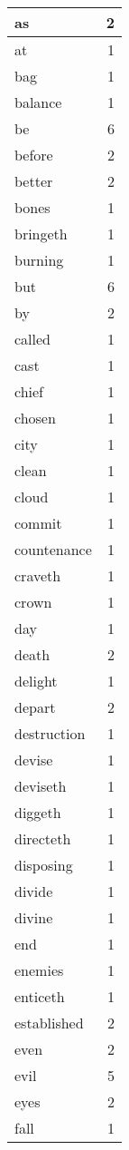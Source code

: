 \begin{center}
\begin{longtable}{l|r}
as & 2\\ \hline 
at & 1\\ \hline 
bag & 1\\ \hline 
balance & 1\\ \hline 
be & 6\\ \hline 
before & 2\\ \hline 
better & 2\\ \hline 
bones & 1\\ \hline 
bringeth & 1\\ \hline 
burning & 1\\ \hline 
but & 6\\ \hline 
by & 2\\ \hline 
called & 1\\ \hline 
cast & 1\\ \hline 
chief & 1\\ \hline 
chosen & 1\\ \hline 
city & 1\\ \hline 
clean & 1\\ \hline 
cloud & 1\\ \hline 
commit & 1\\ \hline 
countenance & 1\\ \hline 
craveth & 1\\ \hline 
crown & 1\\ \hline 
day & 1\\ \hline 
death & 2\\ \hline 
delight & 1\\ \hline 
depart & 2\\ \hline 
destruction & 1\\ \hline 
devise & 1\\ \hline 
deviseth & 1\\ \hline 
diggeth & 1\\ \hline 
directeth & 1\\ \hline 
disposing & 1\\ \hline 
divide & 1\\ \hline 
divine & 1\\ \hline 
end & 1\\ \hline 
enemies & 1\\ \hline 
enticeth & 1\\ \hline 
established & 2\\ \hline 
even & 2\\ \hline 
evil & 5\\ \hline 
eyes & 2\\ \hline 
fall & 1\\ \hline 

\end{longtable}
\end{center}
